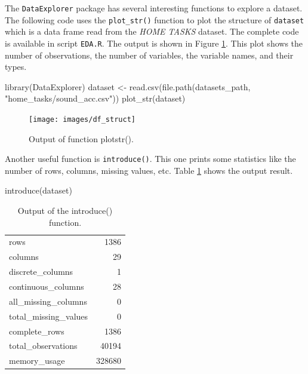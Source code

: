 \documentclass[
  11pt,
]{krantz}
\newenvironment{Shaded}{\begin{snugshade}}{\end{snugshade}}
\newcommand{\FunctionTok}[1]{\textcolor[rgb]{0,0,0}{#1}}
\newcommand{\NormalTok}[1]{#1}
\newcommand{\OtherTok}[1]{\textcolor[rgb]{0.37,0.37,0.37}{#1}}
\newcommand{\StringTok}[1]{\textcolor[rgb]{0.5,0.5,0.5}{#1}}
\begin{document}
The \texttt{DataExplorer} package \citep{dataexplorer} has several interesting functions to explore a dataset. The following code uses the \texttt{plot\_str()} function to plot the structure of \texttt{dataset} which is a data frame read from the \emph{HOME TASKS} dataset. The complete code is available in script \texttt{EDA.R}. The output is shown in Figure \ref{fig:dfStructure}. This plot shows the number of observations, the number of variables, the variable names, and their types.

\begin{Shaded}
\begin{Highlighting}[]
\FunctionTok{library}\NormalTok{(DataExplorer)}
\NormalTok{dataset }\OtherTok{\textless{}{-}} \FunctionTok{read.csv}\NormalTok{(}\FunctionTok{file.path}\NormalTok{(datasets\_path, }\StringTok{"home\_tasks/sound\_acc.csv"}\NormalTok{))}
\FunctionTok{plot\_str}\NormalTok{(dataset)}
\end{Highlighting}
\end{Shaded}

\begin{figure}

{\centering \texttt{[image: images/df\_struct]} 

}

\caption{Output of function plotstr().}\label{fig:dfStructure}
\end{figure}

Another useful function is \texttt{introduce()}. This one prints some statistics like the number of rows, columns, missing values, etc. Table \ref{tab:introduceCmd} shows the output result.

\begin{Shaded}
\begin{Highlighting}[]
\FunctionTok{introduce}\NormalTok{(dataset)}
\end{Highlighting}
\end{Shaded}

\begin{table}

\caption{\label{tab:introduceCmd}Output of the introduce() function.}
\centering
\begin{tabular}[t]{lr}
\toprule
rows & 1386\\
columns & 29\\
discrete\_columns & 1\\
continuous\_columns & 28\\
all\_missing\_columns & 0\\
\addlinespace
total\_missing\_values & 0\\
complete\_rows & 1386\\
total\_observations & 40194\\
memory\_usage & 328680\\
\bottomrule
\end{tabular}
\end{table}
\end{document}
